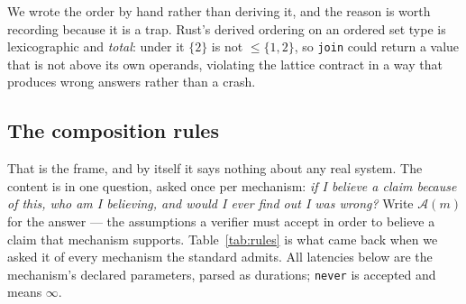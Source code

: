 \documentclass[11pt]{article}
\newcommand{\Never}{\infty}
\begin{document}
We wrote the order by hand rather than deriving it, and the reason is worth
recording because it is a trap. Rust's derived ordering on an ordered set
type is lexicographic and \emph{total}: under it $\{2\}$ is not $\le
\{1,2\}$, so \texttt{join} could return a value that is not above its own
operands, violating the lattice contract in a way that produces wrong answers
rather than a crash.

\subsection{The composition rules}

That is the frame, and by itself it says nothing about any real system. The
content is in one question, asked once per mechanism: \emph{if I believe a
claim because of this, who am I believing, and would I ever find out I was
wrong?} Write $\mathcal{A}(m)$ for the answer --- the assumptions a verifier
must accept in order to believe a claim that mechanism supports.
Table~\ref{tab:rules} is what came back when we asked it of every mechanism the
standard admits. All latencies below are the mechanism's declared parameters,
parsed as durations; \texttt{never} is accepted and means $\Never$.
\end{document}
